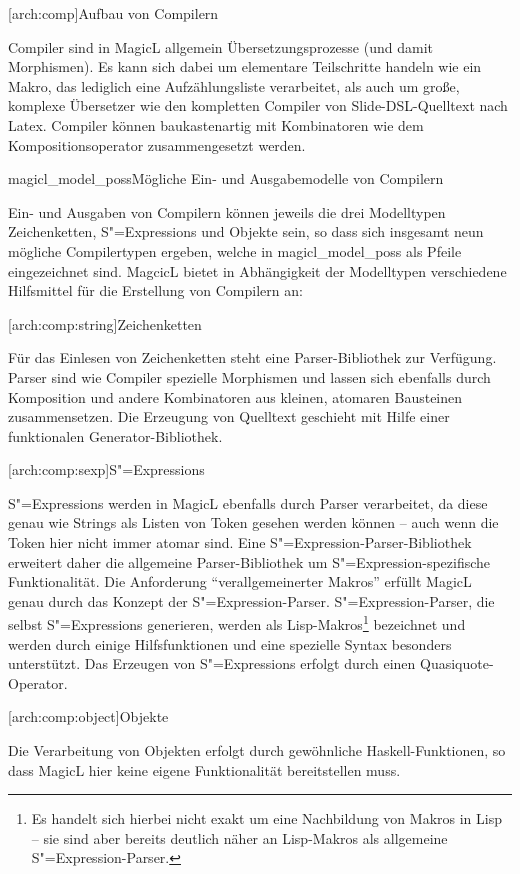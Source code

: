 \documentclass[12pt, a4paper, bibgerm]{scrbook}
\newcommand\lsection{}
\newcommand\lsubsubsection{}
\newcommand\abb{}
\newcommand\fig{}
\newcommand{\sexp}{S"=Expression}
\newcommand{\sexps}{S"=Expressions}
\begin{document}
\lsection[arch:comp]{Aufbau von Compilern}

Compiler sind in MagicL allgemein Übersetzungsprozesse (und damit
Morphismen). Es kann sich dabei um elementare Teilschritte handeln wie
ein Makro, das lediglich eine Aufzählungsliste verarbeitet, als auch um
große, komplexe Übersetzer wie den kompletten Compiler von
Slide-DSL-Quelltext nach Latex. Compiler können baukastenartig mit
Kombinatoren wie dem Kompositionsoperator zusammengesetzt werden.

\fig{magicl_model_poss}{Mögliche Ein- und Ausgabemodelle von Compilern}

Ein- und Ausgaben von Compilern können jeweils die drei Modelltypen
Zeichenketten, \sexps{} und Objekte sein, so dass sich insgesamt neun
mögliche Compilertypen ergeben, welche in \abb{magicl_model_poss} als
Pfeile eingezeichnet sind. MagcicL bietet in Abhängigkeit der
Modelltypen verschiedene Hilfsmittel für die Erstellung von Compilern
an:

\lsubsubsection[arch:comp:string]{Zeichenketten}

Für das Einlesen von Zeichenketten steht eine Parser-Bibliothek zur
Verfügung. Parser sind wie Compiler spezielle Morphismen und lassen sich
ebenfalls durch Komposition und andere Kombinatoren aus kleinen,
atomaren Bausteinen zusammensetzen. Die Erzeugung von Quelltext
geschieht mit Hilfe einer funktionalen Generator-Bibliothek.

\lsubsubsection[arch:comp:sexp]{\sexps}

\sexps{} werden in MagicL ebenfalls durch Parser verarbeitet, da diese
genau wie Strings als Listen von Token gesehen werden können -- auch
wenn die Token hier nicht immer atomar sind. Eine
\sexp{}-Parser-Bibliothek erweitert daher die allgemeine
Parser-Bibliothek um \sexp{}-spezifische Funktionalität. Die Anforderung
"`verallgemeinerter Makros"' erfüllt MagicL genau durch das Konzept der
\sexp{}-Parser. \sexp{}-Parser, die selbst \sexps{} generieren, werden
als Lisp-Makros\footnote{Es handelt sich hierbei nicht exakt um eine
  Nachbildung von Makros in Lisp -- sie sind aber bereits deutlich näher
  an Lisp-Makros als allgemeine \sexp{}-Parser.} bezeichnet und werden
durch einige Hilfsfunktionen und eine spezielle Syntax besonders
unterstützt. Das Erzeugen von \sexps{} erfolgt durch einen
Quasiquote-Operator.

\lsubsubsection[arch:comp:object]{Objekte}

Die Verarbeitung von Objekten erfolgt durch gewöhnliche
Haskell-Funktionen, so dass MagicL hier keine eigene Funktionalität
bereitstellen muss. 
\end{document}
